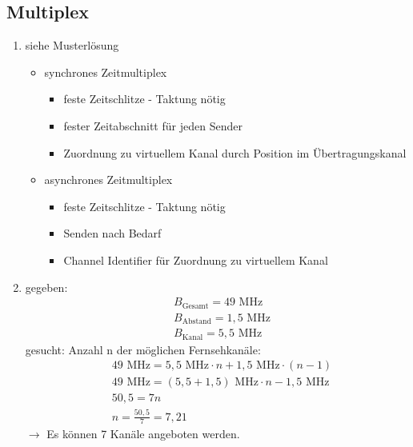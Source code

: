 \subsection{Multiplex}
\begin{enumerate}
	\item siehe Musterlösung
	\begin{itemize}
		\item synchrones Zeitmultiplex
		\begin{itemize}
			\item feste Zeitschlitze - Taktung nötig
			\item fester Zeitabschnitt für jeden Sender
			\item Zuordnung zu virtuellem Kanal durch Position im Übertragungskanal
		\end{itemize}
		\item asynchrones Zeitmultiplex
		\begin{itemize}
			\item feste Zeitschlitze - Taktung nötig
			\item Senden nach Bedarf
			\item Channel Identifier für Zuordnung zu virtuellem Kanal
		\end{itemize}
	\end{itemize}
	\item gegeben:
	\begin{align*}
		&B_{\text{Gesamt}} = 49 \text{ MHz} \\
		&B_{\text{Abstand}} = 1,5 \text{ MHz} \\
		&B_{\text{Kanal}} = 5,5 \text{ MHz}
	\end{align*}
	gesucht: Anzahl n der möglichen Fernsehkanäle:
	\begin{align*}
		&49 \text{ MHz} = 5,5 \text{ MHz} \cdot n + 1,5 \text{ MHz} \cdot (n - 1) \\
		&49\text{ MHz} = (5,5+1,5)\text{ MHz} \cdot n - 1,5 \text{ MHz} \\
		&50,5 = 7n \\
		&n = \frac{50,5}{7} = 7,21
	\end{align*}
	\(\to\) Es können 7 Kanäle angeboten werden.
\end{enumerate}

